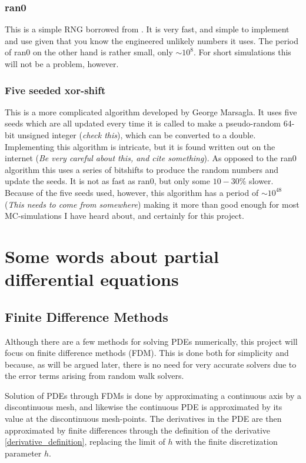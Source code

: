 \subsubsection{ran0}

This is a simple RNG borrowed from \cite{jensen2013computational}. 
It is very fast, and simple to implement and use given that you know the engineered unlikely numbers it uses. 
The period of ran0 on the other hand is rather small, only $\sim 10^8$. For short simulations this will not be a problem, however.

\subsubsection{Five seeded xor-shift}

This is a more complicated algorithm developed by George Marsagla. 
It uses five seeds which are all updated every time it is called to make a pseudo-random 64-bit unsigned integer (\emph{check this}), which can be converted to a double. 
Implementing this algorithm is intricate, but it is found written out on the internet (\emph{Be very careful about this, and cite something}). 
As opposed to the ran0 algorithm this uses a series of bitshifts to produce the random numbers and update the seeds. 
It is not as fast as ran0, but only some $10-30\%$ slower. 
Because of the five seeds used, however, this algorithm has a period of $\sim10^{48}$ (\emph{This needs to come from somewhere}) making it more than good enough for most MC-simulations I have heard about, and certainly for this project.

\section{Some words about partial differential equations}\label{some_words_on_PDEs}

\subsection{Finite Difference Methods}\label{finite_difference_methods}

Although there are a few methods for solving PDEs numerically, this project will focus on finite difference methods (FDM). 
This is done both for simplicity and because, as will be argued later, there is no need for very accurate solvers due to the error terms arising from random walk solvers. 

Solution of PDEs through FDMs is done by approximating a continuous axis by a discontinuous mesh, and likewise the continuous PDE is approximated by its value at the discontinuous mesh-points. 
The derivatives in the PDE are then approximated by finite differences through the definition of the derivative \eqref{derivative_definition}, replacing the limit of $h$ with the  finite discretization parameter $h$.

